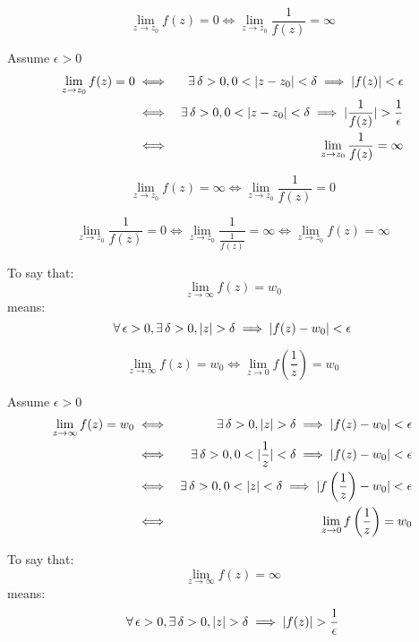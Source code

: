 \documentclass[letterpaper,12pt,fleqn]{article}
\renewcommand{\d}{\delta}
\newcommand{\e}{\epsilon}
\newcommand{\limz}{\lim_{z\to z_0}}
\newcommand{\limi}{\lim_{z\to\infty}}
\newcommand{\limo}{\lim_{z\to0}}
\begin{document}
\begin{theorem}
  \listbreak
  \[\limz{f(z)}=0\iff\limz{\frac{1}{f(z)}}=\infty\]
\end{theorem}

\begin{theproof}
  Assume $\e>0$
  \begin{eqnarray*}
    \limz{f(z)}=0 &\iff& \exists\,\d>0,0<\abs{z-z_0}<\d\implies\abs{f(z)}<\e \\
    &\iff& \exists\,\d>0,0<\abs{z-z_0}<\d\implies
    \abs{\frac{1}{f(z)}}>\frac{1}{\e} \\
    &\iff& \limz{\frac{1}{f(z)}}=\infty \\
  \end{eqnarray*}
\end{theproof}

\begin{corollary}
  \listbreak
  \[\limz{f(z)}=\infty\iff\limz{\frac{1}{f(z)}}=0\]
\end{corollary}

\begin{theproof}
  \[\limz{\frac{1}{f(z)}}=0\iff\limz{\frac{1}{\frac{1}{f(z)}}}=\infty\iff
  \limz{f(z)}=\infty\]
\end{theproof}

\begin{definition}
  To say that:
  \[\limi{f(z)}=w_0\]
  means:
  \[\forall\,\e>0,\exists\,\d>0,\abs{z}>\d\implies\abs{f(z)-w_0}<\e\]
\end{definition}

\begin{theorem}
  \listbreak
  \[\limi{f(z)}=w_0\iff\limo{f\left(\frac{1}{z}\right)}=w_0\]
\end{theorem}
\newpage
\begin{theproof}
  Assume $\e>0$
  \begin{eqnarray*}
    \limi{f(z)}=w_0 &\iff&
    \exists\,\d>0,\abs{z}>\d\implies\abs{f(z)-w_0}<\e \\
    &\iff& \exists\,\d>0,0<\abs{\frac{1}{z}}<\d\implies\abs{f(z)-w_0}<\e \\
    &\iff& \exists\,\d>0,0<\abs{z}<\d\implies
    \abs{f\left(\frac{1}{z}\right)-w_0}<\e \\
    &\iff& \limo{f\left(\frac{1}{z}\right)}=w_0 \\
  \end{eqnarray*}
\end{theproof}

\begin{definition}
  To say that:
  \[\limi{f(z)}=\infty\]
  means:
  \[\forall\,\e>0,\exists\,\d>0,\abs{z}>\d\implies\abs{f(z)}>\frac{1}{\e}\]
\end{definition}
\end{document}
